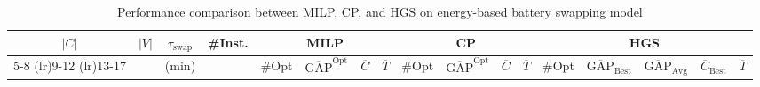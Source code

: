 \documentclass[3p, authoryear, 11pt]{elsarticle}
\begin{document}
\begin{table}[H]
    \centering
    \setlength{\tabcolsep}{3pt} %
    \renewcommand{\arraystretch}{0.95} %
    \caption{Performance comparison between MILP, CP, and HGS on energy-based battery swapping model}
    \label{tab:performance_milp_cp_hgs_energy_based}
    \scriptsize
    \begin{tabular}{cccc cccc cccc ccccc}
    \toprule
    \multirow{2}{*}{$|C|$} & 
    \multirow{2}{*}{$|V|$} & 
    \multirow{2}{*}{$\tau_{\text{swap}}$} & 
    \multirow{2}{*}{\#Inst.} &
    \multicolumn{4}{c}{MILP} & 
    \multicolumn{4}{c}{CP} & 
    \multicolumn{5}{c}{HGS} \\
    \cmidrule(lr){5-8} \cmidrule(lr){9-12} \cmidrule(lr){13-17}
    & & (min) & 
    & \#Opt 
    & $\overline{\mathrm{GAP}}^{\mathrm{Opt}}$ 
    & $\overline{C}$ 
    & $\overline{T}$ 
    & \#Opt 
    & $\overline{\mathrm{GAP}}^{\mathrm{Opt}}$ 
    & $\overline{C}$ 
    & $\overline{T}$ 
    & \#Opt 
    & $\overline{\mathrm{GAP}}_{\text{Best}}$ 
    & $\overline{\mathrm{GAP}}_{\text{Avg}}$ 
    & $\overline{C}_{\text{Best}}$ 
    & $\overline{T}$ \\
    \midrule
    

\end{tabular}
\end{table}
\end{document}
